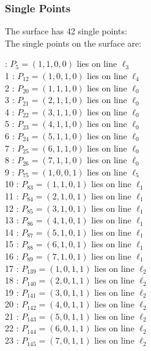 \documentclass{article}
\begin{document}
{\subsubsection*{Single Points}
The surface has 42 single points:\\
The single points on the surface are:\\
\begin{multicols}{2}
 : $P_{5}=( 1, 1, 0, 0 )$ lies on line $\ell_{3}$\\
1 : $P_{12}=( 1, 0, 1, 0 )$ lies on line $\ell_{4}$\\
2 : $P_{20}=( 1, 1, 1, 0 )$ lies on line $\ell_{0}$\\
3 : $P_{21}=( 2, 1, 1, 0 )$ lies on line $\ell_{0}$\\
4 : $P_{22}=( 3, 1, 1, 0 )$ lies on line $\ell_{0}$\\
5 : $P_{23}=( 4, 1, 1, 0 )$ lies on line $\ell_{0}$\\
6 : $P_{24}=( 5, 1, 1, 0 )$ lies on line $\ell_{0}$\\
7 : $P_{25}=( 6, 1, 1, 0 )$ lies on line $\ell_{0}$\\
8 : $P_{26}=( 7, 1, 1, 0 )$ lies on line $\ell_{0}$\\
9 : $P_{75}=( 1, 0, 0, 1 )$ lies on line $\ell_{5}$\\
10 : $P_{83}=( 1, 1, 0, 1 )$ lies on line $\ell_{1}$\\
11 : $P_{84}=( 2, 1, 0, 1 )$ lies on line $\ell_{1}$\\
12 : $P_{85}=( 3, 1, 0, 1 )$ lies on line $\ell_{1}$\\
13 : $P_{86}=( 4, 1, 0, 1 )$ lies on line $\ell_{1}$\\
14 : $P_{87}=( 5, 1, 0, 1 )$ lies on line $\ell_{1}$\\
15 : $P_{88}=( 6, 1, 0, 1 )$ lies on line $\ell_{1}$\\
16 : $P_{89}=( 7, 1, 0, 1 )$ lies on line $\ell_{1}$\\
17 : $P_{139}=( 1, 0, 1, 1 )$ lies on line $\ell_{2}$\\
18 : $P_{140}=( 2, 0, 1, 1 )$ lies on line $\ell_{2}$\\
19 : $P_{141}=( 3, 0, 1, 1 )$ lies on line $\ell_{2}$\\
20 : $P_{142}=( 4, 0, 1, 1 )$ lies on line $\ell_{2}$\\
21 : $P_{143}=( 5, 0, 1, 1 )$ lies on line $\ell_{2}$\\
22 : $P_{144}=( 6, 0, 1, 1 )$ lies on line $\ell_{2}$\\
23 : $P_{145}=( 7, 0, 1, 1 )$ lies on line $\ell_{2}$\\

\end{multicols}}
\end{document}
